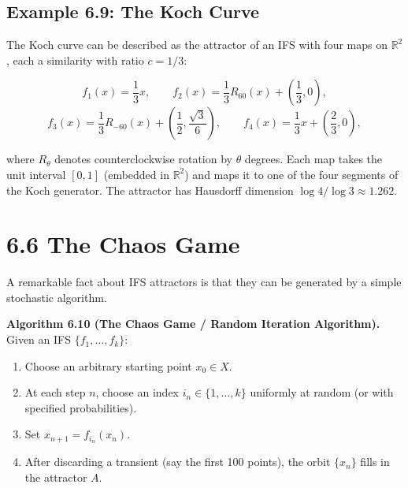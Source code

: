 \subsection{Example 6.9: The Koch Curve}

The Koch curve can be described as the attractor of an IFS with four maps on $\mathbb{R}^2$, each a similarity with ratio $c = 1/3$:

\[
f_1(x) = \frac{1}{3}x, \qquad f_2(x) = \frac{1}{3}R_{60}(x) + \left(\frac{1}{3}, 0\right),
\]
\[
f_3(x) = \frac{1}{3}R_{-60}(x) + \left(\frac{1}{2}, \frac{\sqrt{3}}{6}\right), \qquad f_4(x) = \frac{1}{3}x + \left(\frac{2}{3}, 0\right),
\]

where $R_\theta$ denotes counterclockwise rotation by $\theta$ degrees. Each map takes the unit interval $[0, 1]$ (embedded in $\mathbb{R}^2$) and maps it to one of the four segments of the Koch generator. The attractor has Hausdorff dimension $\log 4 / \log 3 \approx 1.262$.

\section{6.6 The Chaos Game}

A remarkable fact about IFS attractors is that they can be generated by a simple stochastic algorithm.

\textbf{Algorithm 6.10 (The Chaos Game / Random Iteration Algorithm).}
Given an IFS $\{ f_1, \ldots, f_k\} $:

\begin{enumerate}
  \item Choose an arbitrary starting point $x_0 \in X$.
  \item At each step $n$, choose an index $i_n \in \{ 1, \ldots, k\} $ uniformly at random (or with specified probabilities).
  \item Set $x_{n+1} = f_{i_n}(x_n)$.
  \item After discarding a transient (say the first 100 points), the orbit $\{ x_n\} $ fills in the attractor $A$.
\end{enumerate}

